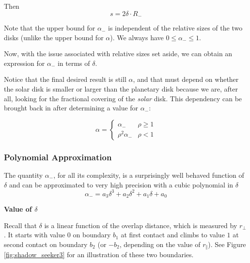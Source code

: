   Then
   \begin{equation*}
     s = 2 \delta \cdot R_{-}
   \end{equation*}

   Note that the upper bound for $\alpha_{-}$ is independent of the
   relative sizes of the two disks (unlike the upper bound for $\alpha$).
   We always have $0 \leqslant \alpha_{-} \leqslant 1$.

   Now, with the issue associated with relative sizes set aside, we can
   obtain an expression for $\alpha_{-}$ in terms of $\delta$.

   Notice that the final desired result is still $\alpha$, and that must
   depend on whether the solar disk is smaller or larger than the
   planetary disk because we are, after
   all, looking for the fractional covering of the \textit{solar} disk.  This
   dependency can be brought back in after determining a value for
   $\alpha_{-}$:


    \begin{equation*}
     \alpha=
      \begin{cases}
       \alpha_{-} & \rho \geqslant 1 \\
       \rho ^{2}\alpha_{-} & \rho <1
      \end{cases}
    \end{equation*}


   \subsubsection{Polynomial Approximation}

    The quantity $\alpha_{-}$, for all its complexity, is a surprisingly
    well behaved function of \textit{${\delta}$} and can be
    approximated to very high
    precision with a cubic polynomial in \textit{${\delta}$}
    \begin{equation*}
     \alpha _{-}= a_{3}\delta ^{3}+ a_{2}\delta ^{2}+
    a_{1}\delta + a_{0}
    \end{equation*}

    \textbf{Value of $\delta$}

    Recall that $\delta$ is a linear function of the overlap distance, which
    is measured by $r_\bot$.  It starts with value $0$ on boundary $b_1$  at
    first
    contact and climbs to value $1$  at second contact on boundary $b_2$ (or
    $-b_2$, depending on the value of $r_\Vert$).  See Figure
    \ref{fig:shadow_seeker3} for an illustration of these two boundaries.

